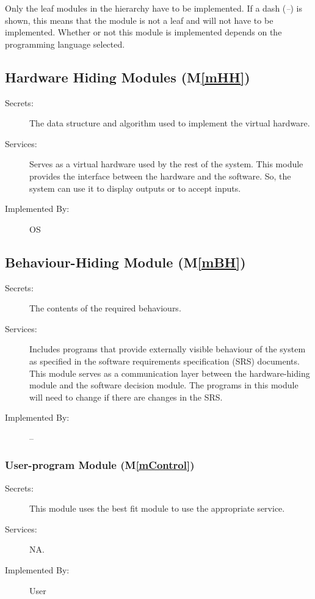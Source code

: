 \documentclass[12pt, titlepage]{article}
\newcommand{\mref}[1]{M\ref{#1}}
\begin{document}
Only the leaf modules in the hierarchy have to be implemented. If a dash (\emph{--}) is shown, this means that the module is not a leaf and will not have to be implemented. Whether or not this module is implemented depends on the programming language selected.

\subsection{Hardware Hiding Modules (\mref{mHH})}

\begin{description}
\item[Secrets:]The data structure and algorithm used to implement the virtual
  hardware.
\item[Services:]Serves as a virtual hardware used by the rest of the
  system. This module provides the interface between the hardware and the
  software. So, the system can use it to display outputs or to accept inputs.
\item[Implemented By:] OS
\end{description}

\subsection{Behaviour-Hiding Module (\mref{mBH})}

\begin{description}
\item[Secrets:]The contents of the required behaviours.
\item[Services:]Includes programs that provide externally visible behaviour of
  the system as specified in the software requirements specification (SRS)
  documents. This module serves as a communication layer between the
  hardware-hiding module and the software decision module. The programs in this
  module will need to change if there are changes in the SRS.
\item[Implemented By:] --
\end{description}
\subsubsection{User-program Module (\mref{mControl})}

\begin{description}
	\item[Secrets:]This module uses the best fit module to use the appropriate service. 
	\item[Services:] NA.
	\item[Implemented By:] User
\end{description}
\end{document}
